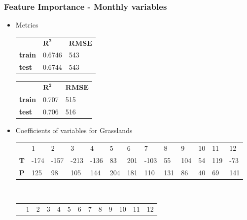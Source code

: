\documentclass[serif, xcolor={dvipsnames}]{beamer} %
\begin{document}
\begin{frame}
\frametitle{Feature Importance - Monthly variables}
\begin{itemize}
\item Metrics
\begin{table}[!ht]
\hspace{-.5in}
\captionsetup{singlelinecheck=false, format=hang}
\label{tab:Metrics}
\begin{tabular}{lll}
\bottomrule
\cellcolor{palecornflowerblue}{\small f(T, P)} & \small{ $\mathbf{R^2}$}  & \small{ $\mathbf{RMSE}$} \\ 
\rowcolor{shadecolor} 
{\bf train} & 0.6746  &  543\\ 
{\bf test}  & 0.6744  & 543\\
\toprule
\end{tabular}\quad
\begin{tabular}{lll}
\bottomrule
\cellcolor{palecornflowerblue}{\small f(T, P, RH)} & $\mathbf{R^2}$  & \small{$\mathbf{RMSE}$} \\ 
\rowcolor{shadecolor} 
{\bf train} &  0.707  &  515\\ 
{\bf test}  & 0.706  & 516\\
\toprule
\end{tabular}
\end{table}
\item Coefficients of variables for Grasslands 
\begin{table}[!ht]
\captionsetup{singlelinecheck=false, format=hang}
\label{tab:regressionCoeffs}
\hspace{-.53in}
\begin{tabular}{lllllllllllll}
\bottomrule
\rowcolor{shadecolor} &  1 & 2 & 3 & 4 & 5 & 6 & 7 & 8 & 9 & 10 & 11 & 12  \\ 
{\bf T} & \tiny{-174} &  \tiny{-157} &  \tiny{-213} &  \tiny{-136} &  \tiny{83} &  \tiny{201} &  \tiny{-103} &  \tiny{55} &  \tiny{104} &  \tiny{54} &  \tiny{119} & \tiny{-73} \\
{\bf P} &   \tiny{125} &  \tiny{98} &  \tiny{105} &  \tiny{144} &  \tiny{204} &  \tiny{181} &  \tiny{110} &  \tiny{131} &  \tiny{86} &  \tiny{40} & \tiny{ 69} &  \tiny{141} \\
\toprule
\end{tabular}\\
\hspace*{-.5in}
\begin{tabular}{lllllllllllll}
\bottomrule
\rowcolor{shadecolor} &  1 & 2 & 3 & 4 & 5 & 6 & 7 & 8 & 9 & 10 & 11 & 12  \\ 

\end{tabular}
\end{table}
\end{itemize}
\end{frame}
\end{document}
